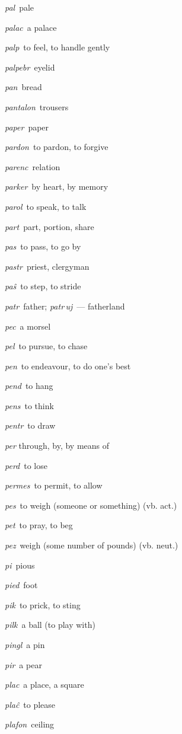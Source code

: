 \begin{landscape}
\begin{multicols}{5}
\begin{outdent}{1em}
\emph{pal\,} pale

\emph{palac\,} a palace

\emph{palp\,} to feel, to handle gently

\emph{palpebr\,} eyelid

\emph{pan\,} bread

\emph{pantalon\,} trousers

\emph{paper\,} paper

\emph{pardon\,} to pardon, to forgive

\emph{parenc\,} relation

\emph{parker\,} by heart, by memory

\emph{parol\,} to speak, to talk

\emph{part\,} part, portion, share

\emph{pas\,} to pass, to go by

\emph{pastr\,} priest, clergyman

\emph{paŝ\,} to step, to stride

\emph{patr\,} father; \emph{patr\,uj\,} — fatherland

\emph{pec\,} a morsel

\emph{pel\,} to pursue, to chase

\emph{pen\,} to endeavour, to do one’s best

\emph{pend\,} to hang

\emph{pens\,} to think

\emph{pentr\,} to draw

\emph{per} through, by, by means of 

\emph{perd\,} to lose

\emph{permes\,} to permit, to allow

\emph{pes\,} to weigh (someone or something) (vb. act.)

\emph{pet\,} to pray, to beg

\emph{pez\,} weigh (some number of pounds) (vb. neut.)

\emph{pi\,} pious

\emph{pied\,} foot

\emph{pik\,} to prick, to sting

\emph{pilk\,} a ball (to play with)

\emph{pingl\,} a pin

\emph{pir\,} a pear

\emph{plac\,} a place, a square

\emph{plaĉ\,} to please

\emph{plafon\,} ceiling


\end{outdent}
\end{multicols}
\end{landscape}
